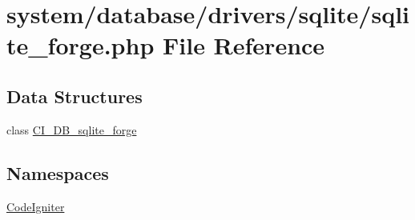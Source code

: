 \hypertarget{sqlite__forge_8php}{\section{system/database/drivers/sqlite/sqlite\-\_\-forge.php File Reference}
\label{sqlite__forge_8php}
}
\subsection*{Data Structures}
\begin{DoxyCompactItemize}
\item 
class \hyperlink{class_c_i___d_b__sqlite__forge}{C\-I\-\_\-\-D\-B\-\_\-sqlite\-\_\-forge}
\end{DoxyCompactItemize}
\subsection*{Namespaces}
\begin{DoxyCompactItemize}
\item 
\hyperlink{namespace_code_igniter}{Code\-Igniter}
\end{DoxyCompactItemize}
